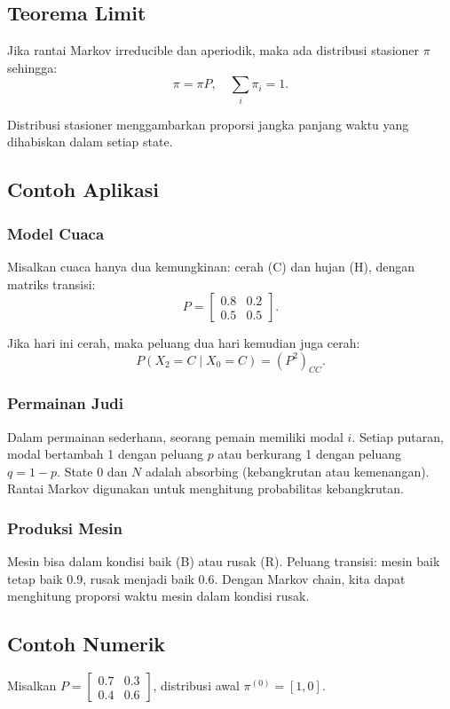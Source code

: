 \documentclass{bukumjh}
\begin{document}
\subsection{Teorema Limit}
Jika rantai Markov irreducible dan aperiodik, maka ada distribusi stasioner $\pi$ sehingga:
\[
\pi = \pi P, \quad \sum_i \pi_i = 1.
\]

Distribusi stasioner menggambarkan proporsi jangka panjang waktu yang dihabiskan dalam setiap state.

\subsection{Contoh Aplikasi}
\subsubsection{Model Cuaca}
Misalkan cuaca hanya dua kemungkinan: cerah (C) dan hujan (H), dengan matriks transisi:
\[
P = \begin{bmatrix}
0.8 & 0.2 \\
0.5 & 0.5
\end{bmatrix}.
\]

Jika hari ini cerah, maka peluang dua hari kemudian juga cerah:
\[
P(X_2=C \mid X_0=C) = (P^2)_{CC}.
\]

\subsubsection{Permainan Judi}
Dalam permainan sederhana, seorang pemain memiliki modal $i$. Setiap putaran, modal bertambah 1 dengan peluang $p$ atau berkurang 1 dengan peluang $q=1-p$. State $0$ dan $N$ adalah absorbing (kebangkrutan atau kemenangan). Rantai Markov digunakan untuk menghitung probabilitas kebangkrutan.

\subsubsection{Produksi Mesin}
Mesin bisa dalam kondisi baik (B) atau rusak (R). Peluang transisi: mesin baik tetap baik 0.9, rusak menjadi baik 0.6. Dengan Markov chain, kita dapat menghitung proporsi waktu mesin dalam kondisi rusak.

\subsection{Contoh Numerik}
Misalkan $P = \begin{bmatrix} 0.7 & 0.3 \\ 0.4 & 0.6 \end{bmatrix}$, distribusi awal $\pi^{(0)} = [1,0]$.
\end{document}
